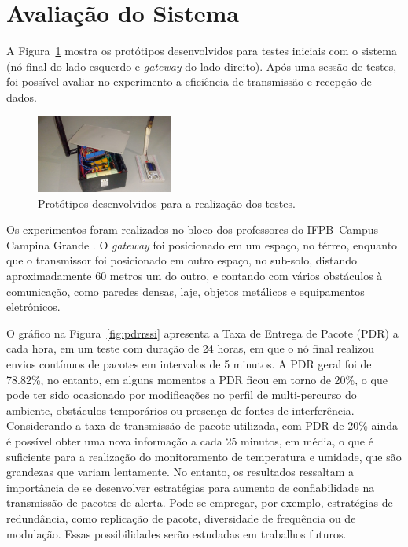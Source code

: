 \section{Avaliação do Sistema}
   
   A Figura~\ref{fig:prot} mostra os protótipos desenvolvidos para testes iniciais com o sistema (nó final do lado esquerdo e \textit{gateway} do lado direito). Após uma sessão de testes, foi possível avaliar no experimento a eficiência de transmissão e recepção de dados.%
   
   \begin{figure}[t!]
    \begin{center}
        \centering
        \includegraphics[width=0.4\textwidth]{assets/prototipo.jpeg}
    \end{center}
    \caption{Protótipos desenvolvidos para a realização dos testes.}
    \label{fig:prot}
\end{figure}
   
   Os experimentos foram realizados no bloco dos professores do IFPB--Campus Campina Grande \cite{ref7}. O \textit{gateway} foi posicionado em um espaço, no térreo, enquanto que o transmissor foi posicionado em outro espaço, no sub-solo, distando aproximadamente  60 metros um do outro, e contando com vários obstáculos à comunicação, como paredes densas, laje, objetos metálicos e equipamentos eletrônicos.
   
  O gráfico na Figura~\ref{fig:pdrrssi} apresenta a Taxa de Entrega de Pacote (PDR) a cada hora, em um teste com duração de 24 horas, em que o nó final realizou envios contínuos de pacotes em intervalos de 5 minutos. A PDR geral foi de 78.82\%, no entanto, em alguns momentos a PDR ficou em torno de 20\%, o que pode ter sido ocasionado por modificações no perfil de multi-percurso do ambiente, obstáculos temporários ou presença de fontes de interferência. Considerando a taxa de transmissão de pacote utilizada, com PDR de 20\% ainda é possível obter uma nova informação a cada 25 minutos, em média, o que é suficiente para a realização do monitoramento de temperatura e umidade, que são grandezas que variam lentamente. No entanto, os resultados ressaltam a importância de se desenvolver estratégias para aumento de confiabilidade na transmissão de pacotes de alerta. Pode-se empregar, por exemplo, estratégias de redundância, como replicação de pacote, diversidade de frequência ou de modulação. Essas possibilidades serão estudadas em trabalhos futuros.
   
